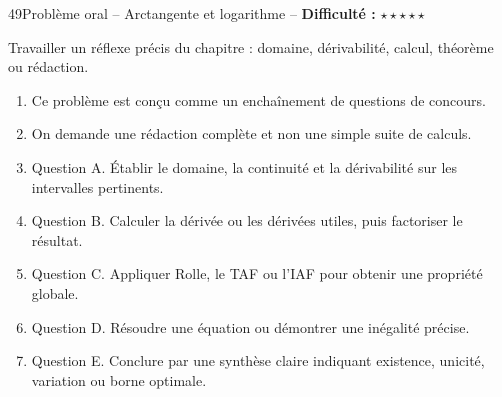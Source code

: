 \documentclass[11pt,a4paper]{article}
\newcommand{\etoiles}[1]{\textbf{Difficulté :} #1}
\begin{document}
\begin{exobox}{49}{Problème oral -- Arctangente et logarithme -- \etoiles{$\star\star\star\star\star$}}

\begin{objectifbox}
Travailler un réflexe précis du chapitre : domaine, dérivabilité, calcul, théorème ou rédaction.
\end{objectifbox}

\begin{enumerate}

\item Ce problème est conçu comme un enchaînement de questions de concours.

\item On demande une rédaction complète et non une simple suite de calculs.

\item Question A. Établir le domaine, la continuité et la dérivabilité sur les intervalles pertinents.

\item Question B. Calculer la dérivée ou les dérivées utiles, puis factoriser le résultat.

\item Question C. Appliquer Rolle, le TAF ou l'IAF pour obtenir une propriété globale.

\item Question D. Résoudre une équation ou démontrer une inégalité précise.

\item Question E. Conclure par une synthèse claire indiquant existence, unicité, variation ou borne optimale.

\end{enumerate}

\end{exobox}
\end{document}
